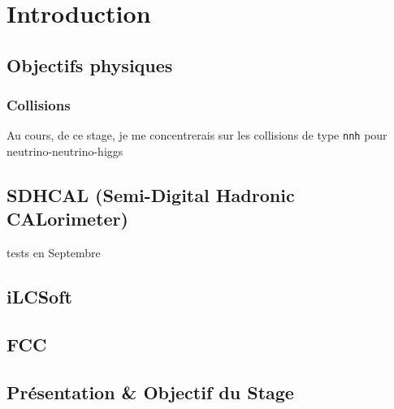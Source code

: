 \chapter{Introduction}

\section{Objectifs physiques}

\subsection{Collisions}
Au cours, de ce stage, je me concentrerais sur les collisions de type \texttt{nnh} pour neutrino-neutrino-higgs

\section{SDHCAL (Semi-Digital Hadronic CALorimeter)}

tests en Septembre

\section{iLCSoft}

\section{FCC}

\section{Présentation \& Objectif du Stage}

